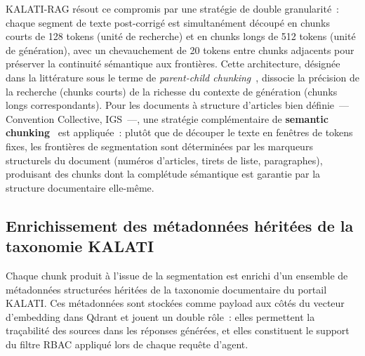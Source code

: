 \documentclass[12pt,a4paper]{report}
\begin{document}
KALATI-RAG résout ce compromis par une stratégie de double granularité~: chaque segment de texte
post-corrigé est simultanément découpé en chunks courts de 128 tokens (unité de recherche) et en
chunks longs de 512 tokens (unité de génération), avec un chevauchement de 20 tokens entre chunks
adjacents pour préserver la continuité sémantique aux frontières. Cette architecture, désignée
dans la littérature sous le terme de \textit{parent-child chunking}~\autocite{Chen2023}, dissocie
la précision de la recherche (chunks courts) de la richesse du contexte de génération (chunks
longs correspondants). Pour les documents à structure d'articles bien définie~--- Convention
Collective, IGS~---, une stratégie complémentaire de \textbf{semantic chunking}~\autocite{Chen2023}
est appliquée~: plutôt que de découper le texte en fenêtres de tokens fixes, les frontières de
segmentation sont déterminées par les marqueurs structurels du document (numéros d'articles,
tirets de liste, paragraphes), produisant des chunks dont la complétude sémantique est garantie
par la structure documentaire elle-même.

\subsection{Enrichissement des métadonnées héritées de la taxonomie KALATI}

Chaque chunk produit à l'issue de la segmentation est enrichi d'un ensemble de métadonnées
structurées héritées de la taxonomie documentaire du portail KALATI. Ces métadonnées sont stockées
comme payload aux côtés du vecteur d'embedding dans Qdrant et jouent un double rôle~: elles
permettent la traçabilité des sources dans les réponses générées, et elles constituent le support
du filtre RBAC appliqué lors de chaque requête d'agent.
\end{document}

